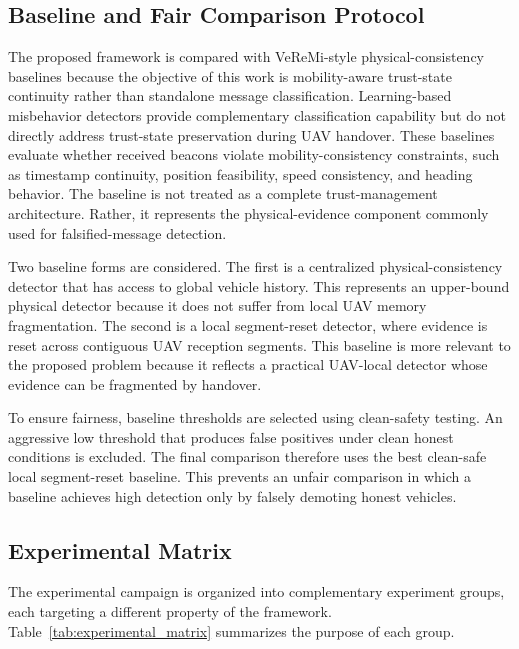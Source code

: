 \documentclass[journal]{IEEEtran}
\begin{document}
\subsection{Baseline and Fair Comparison Protocol}
\label{subsec:baseline_protocol}

The proposed framework is compared with VeReMi-style
physical-consistency baselines because the objective of this work
is mobility-aware trust-state continuity rather than standalone message
classification. Learning-based misbehavior detectors provide
complementary classification capability but do not directly address
trust-state preservation during UAV handover. These baselines evaluate
whether received beacons violate mobility-consistency constraints, such as
timestamp continuity, position feasibility, speed consistency, and heading
behavior. The baseline is not treated as a complete trust-management
architecture. Rather, it represents the physical-evidence component commonly
used for falsified-message detection.

Two baseline forms are considered. The first is a centralized physical-consistency detector that has access to global vehicle history. This represents an upper-bound physical detector because it does not suffer from local UAV memory fragmentation. The second is a local segment-reset detector, where evidence is reset across contiguous UAV reception segments. This baseline is more relevant to the proposed problem because it reflects a practical UAV-local detector whose evidence can be fragmented by handover.

To ensure fairness, baseline thresholds are selected using clean-safety testing. An aggressive low threshold that produces false positives under clean honest conditions is excluded. The final comparison therefore uses the best clean-safe local segment-reset baseline. This prevents an unfair comparison in which a baseline achieves high detection only by falsely demoting honest vehicles.

\subsection{Experimental Matrix}
\label{subsec:experimental_matrix}

The experimental campaign is organized into complementary experiment groups, each targeting a different property of the framework. Table~\ref{tab:experimental_matrix} summarizes the purpose of each group.
\end{document}
